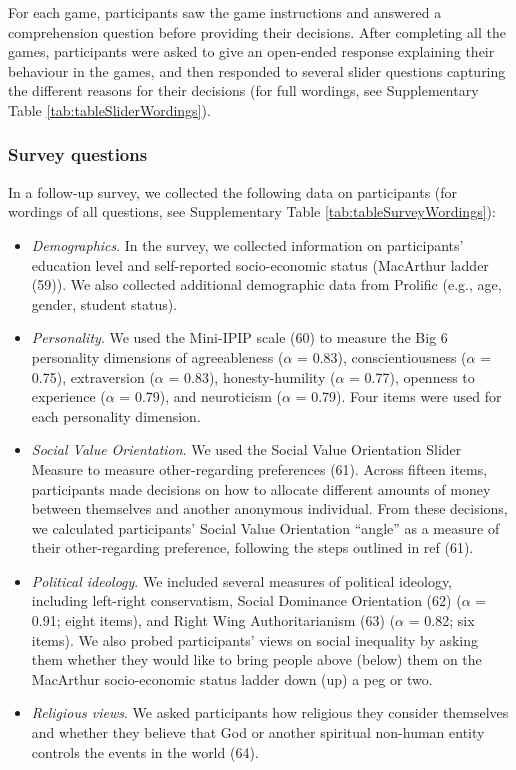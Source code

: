 \documentclass[
  english,
  man, donotrepeattitle,floatsintext]{apa6}
\providecommand{\tightlist}{%
  \setlength{\itemsep}{0pt}\setlength{\parskip}{0pt}}
\begin{document}
For each game, participants saw the game instructions and answered a
comprehension question before providing their decisions. After completing all
the games, participants were asked to give an open-ended response explaining
their behaviour in the games, and then responded to several slider questions
capturing the different reasons for their decisions (for full wordings, see
Supplementary Table \ref{tab:tableSliderWordings}).

\hypertarget{survey-questions}{%
\subsubsection{Survey questions}\label{survey-questions}}

In a follow-up survey, we collected the following data on participants (for
wordings of all questions, see Supplementary Table
\ref{tab:tableSurveyWordings}):

\begin{itemize}
\tightlist
\item
  \emph{Demographics}. In the survey, we collected information on participants'
  education level and self-reported socio-economic status (MacArthur ladder
  (59)). We also collected additional demographic data from Prolific
  (e.g., age, gender, student status).
\item
  \emph{Personality}. We used the Mini-IPIP scale (60) to measure the Big 6
  personality dimensions of agreeableness (\(\alpha\) =
  0.83), conscientiousness (\(\alpha\) =
  0.75), extraversion (\(\alpha\) =
  0.83), honesty-humility (\(\alpha\) =
  0.77), openness to experience (\(\alpha\) =
  0.79), and neuroticism (\(\alpha\) =
  0.79). Four items were used for each
  personality dimension.
\item
  \emph{Social Value Orientation}. We used the Social Value Orientation Slider
  Measure to measure other-regarding preferences (61). Across fifteen
  items, participants made decisions on how to allocate different amounts of
  money between themselves and another anonymous individual. From these
  decisions, we calculated participants' Social Value Orientation ``angle'' as a
  measure of their other-regarding preference, following the steps outlined in
  ref (61).
\item
  \emph{Political ideology}. We included several measures of political ideology,
  including left-right conservatism, Social Dominance Orientation (62)
  (\(\alpha\) = 0.91; eight items), and Right
  Wing Authoritarianism (63) (\(\alpha\) =
  0.82; six items). We also probed
  participants' views on social inequality by asking them whether they would
  like to bring people above (below) them on the MacArthur socio-economic status
  ladder down (up) a peg or two.
\item
  \emph{Religious views}. We asked participants how religious they consider
  themselves and whether they believe that God or another spiritual non-human
  entity controls the events in the world (64).
\end{itemize}
\end{document}
